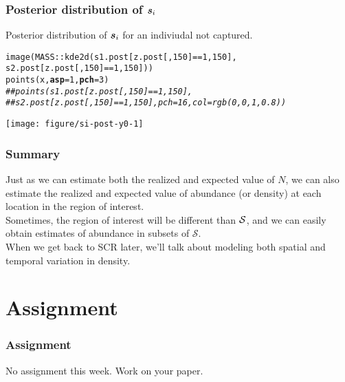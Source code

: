 \documentclass[color=usenames,dvipsnames]{beamer}\usepackage[]{graphicx}\usepackage[]{xcolor}
\makeatletter
\newcommand{\hlnum}[1]{\textcolor[rgb]{0.69,0.494,0}{#1}}%
\newcommand{\hlcom}[1]{\textcolor[rgb]{0.514,0.506,0.514}{\textit{#1}}}%
\newcommand{\hlopt}[1]{\textcolor[rgb]{0,0,0}{#1}}%
\newcommand{\hldef}[1]{\textcolor[rgb]{0,0,0}{#1}}%
\newcommand{\hlkwc}[1]{\textcolor[rgb]{0,0,0}{\textbf{#1}}}%
\newcommand{\hlkwd}[1]{\textcolor[rgb]{0.004,0.004,0.506}{#1}}%
\newenvironment{kframe}{%
 \def\at@end@of@kframe{}%
 \ifinner\ifhmode%
  \def\at@end@of@kframe{\end{minipage}}%
  \begin{minipage}{\columnwidth}%
 \fi\fi%
 \def\FrameCommand##1{\hskip\@totalleftmargin \hskip-\fboxsep
 \colorbox{shadecolor}{##1}\hskip-\fboxsep
     \hskip-\linewidth \hskip-\@totalleftmargin \hskip\columnwidth}%
 \MakeFramed {\advance\hsize-\width
   \@totalleftmargin\z@ \linewidth\hsize
   \@setminipage}}%
 {\par\unskip\endMakeFramed%
 \at@end@of@kframe}
\newenvironment{knitrout}{}{} %
\makeatother
\begin{document}
\begin{frame}[fragile]
  \frametitle{Posterior distribution of ${\bm s}_i$}
  \small
  Posterior distribution of ${\bm s}_i$ for an indiviudal \alert{not}
  captured. 
\begin{knitrout}\scriptsize
{}\color{fgcolor}\begin{kframe}
\begin{alltt}
\hlkwd{image}\hldef{(MASS}\hlopt{::}\hlkwd{kde2d}\hldef{(s1.post[z.post[,}\hlnum{150}\hldef{]}\hlopt{==}\hlnum{1}\hldef{,}\hlnum{150}\hldef{],}
                  \hldef{s2.post[z.post[,}\hlnum{150}\hldef{]}\hlopt{==}\hlnum{1}\hldef{,}\hlnum{150}\hldef{]))}
\hlkwd{points}\hldef{(x,} \hlkwc{asp}\hldef{=}\hlnum{1}\hldef{,} \hlkwc{pch}\hldef{=}\hlnum{3}\hldef{)}
\hlcom{##points(s1.post[z.post[,150]==1,150],}
\hlcom{##       s2.post[z.post[,150]==1,150], pch=16, col=rgb(0,0,1,0.8))}
\end{alltt}
\end{kframe}
\end{knitrout}
\centering
\texttt{[image: figure/si-post-y0-1]} \\
\end{frame}





\begin{frame}
  \frametitle{Summary}
  Just as we can estimate both the realized and expected value of $N$,
  we can also estimate the realized and expected value of abundance
  (or density) at each location in the region of interest. \\
  \pause \vfill
  Sometimes, the region of interest will be different than
  $\cal S$, and we can easily obtain estimates of abundance in
  subsets of $\mathcal{S}$. \\
  \pause \vfill
  When we get back to SCR later, we'll talk about modeling both
  spatial and temporal variation in density.
\end{frame}




\section{Assignment}




\begin{frame}[fragile]
  \frametitle{Assignment}
  No assignment this week. Work on your paper. \\
\end{frame}
\end{document}
